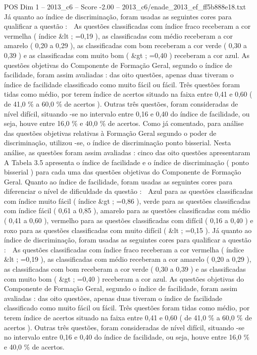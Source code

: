 \begin{textsample}{POS Dim 1 – 2013\_c6 – Score -2.00 – 2013\_c6/enade\_2013\_ef\_ff5b888e18.txt}
Já quanto ao índice de discriminação, foram usadas as seguintes cores para qualificar a questão :  As questões classificadas com índice fraco receberam a cor vermelha ( índice \&lt ; =0,19 ), as classificadas com médio receberam a cor amarelo ( 0,20 a 0,29 ), as classificadas com bom receberam a cor verde ( 0,30 a 0,39 ) e as classificadas com muito bom ( \&gt ; =0,40 ) receberam a cor azul.
As questões objetivas do Componente de Formação Geral, segundo o índice de facilidade, foram assim avaliadas : das oito questões, apenas duas tiveram o índice de facilidade classificado como muito fácil ou fácil.
Três questões foram tidas como médio, por terem índice de acertos situado na faixa entre 0,41 e 0,60 ( de 41,0 \% a 60,0 \% de acertos ).
Outras três questões, foram consideradas de nível difícil, situando -se no intervalo entre 0,16 e 0,40 do índice de facilidade, ou seja, houve entre 16,0 \% e 40,0 \% de acertos.
Como já comentado, para análise das questões objetivas relativas à Formação Geral segundo o poder de discriminação, utilizou -se, o índice de discriminação ponto bisserial.
Nesta análise, as questões foram assim avaliadas : cinco das oito questões apresentaram A Tabela 3.5 apresenta o índice de facilidade e o índice de discriminação ( ponto bisserial ) para cada uma das questões objetivas do Componente de Formação Geral.
Quanto ao índice de facilidade, foram usadas as seguintes cores para diferenciar o nível de dificuldade da questão :  Azul para as questões classificadas com índice muito fácil ( índice \&gt ; =0,86 ), verde para as questões classificadas com índice fácil ( 0,61 a 0,85 ), amarelo para as questões classificadas com médio ( 0,41 a 0,60 ), vermelho para as questões classificadas com difícil ( 0,16 a 0,40 ) e roxo para as questões classificadas com muito difícil ( \&lt ; =0,15 ).
Já quanto ao índice de discriminação, foram usadas as seguintes cores para qualificar a questão :  As questões classificadas com índice fraco receberam a cor vermelha ( índice \&lt ; =0,19 ), as classificadas com médio receberam a cor amarelo ( 0,20 a 0,29 ), as classificadas com bom receberam a cor verde ( 0,30 a 0,39 ) e as classificadas com muito bom ( \&gt ; =0,40 ) receberam a cor azul.
As questões objetivas do Componente de Formação Geral, segundo o índice de facilidade, foram assim avaliadas : das oito questões, apenas duas tiveram o índice de facilidade classificado como muito fácil ou fácil.
Três questões foram tidas como médio, por terem índice de acertos situado na faixa entre 0,41 e 0,60 ( de 41,0 \% a 60,0 \% de acertos ).
Outras três questões, foram consideradas de nível difícil, situando -se no intervalo entre 0,16 e 0,40 do índice de facilidade, ou seja, houve entre 16,0 \% e 40,0 \% de acertos.

\end{textsample}
